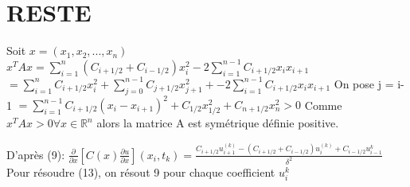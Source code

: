 \documentclass[a4paper,11pt]{article}
\newcommand{\R}{\mathbb{R}}
\theoremstyle{nonumberplain}
\theoremstyle{nonumberplain}
\begin{document}
    \section{RESTE}

    Soit $x = (x_1, x_2, ... , x_n)$
    \newline
    $x^TAx = \sum\limits_{i = 1}^{n} (C_{i+1/2} + C_{i-1/2}) x_i^2 - 2 \sum\limits_{i = 1}^{n-1} C_{i+1/2} x_i x_{i+1} $
    \newline
    $ = \sum\limits_{i = 1}^{n} C_{i+1/2} x_i^2 + \sum\limits_{j = 0}^{n-1} C_{j+1/2} x_{j+1}^2  + - 2 \sum\limits_{i = 1}^{n-1} C_{i+1/2} x_i x_{i+1} $ On pose j = i-1
    \newline
    $ = \sum\limits_{i = 1}^{n-1} C_{i+1/2} (x_i - x_{i+1})^2 + C_{1/2} x_{1/2}^2 + C_{n + 1/2} x_{n}^2 > 0 $
    \newline
    Comme $x^TAx > 0 \forall x \in \R ^n $ alors la matrice A est symétrique définie positive.
    \newline

    D'après (9):
    $ \frac{\partial}{\partial x}[C(x)\frac{\partial u}{\partial x}](x_i, t_k) = \frac{
    C_{i+1/2}u_{i+1}^{(k)} - (C_{i+1/2} + C_{i-1/2})u_i^{(k)}+C_{i-1/2}u_{i-1}^{k}}{\delta^{2}}$
    Pour résoudre (13), on résout 9 pour chaque coefficient $u_i^{k}$
\end{document}
